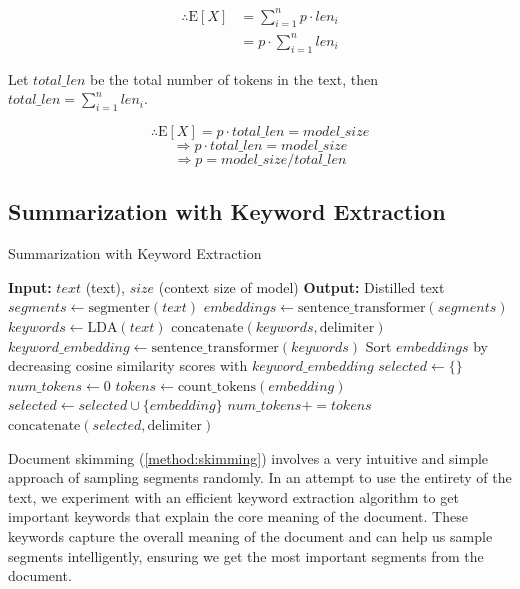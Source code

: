 			\begin{align*}
				\therefore \mathrm{E}[X] &= \sum_{i = 1}^{n} p \cdot len_i \\
				&= p \cdot \sum_{i = 1}^{n} len_i
			\end{align*}

			Let $total\_len$ be the total number of tokens in the text, then
			$total\_len = \sum_{i = 1}^{n} len_i$.

			\[ \therefore \mathrm{E}[X] = p \cdot total\_len = model\_size \]
			\[ \Rightarrow p \cdot total\_len = model\_size \]
			\[ \Rightarrow p = model\_size / total\_len \]


	\subsection{Summarization with Keyword Extraction}
		\label{method:keyword}

		\begin{algorithm*}
			\caption{Summarization with Keyword Extraction}
			\begin{algorithmic}
				\State \textbf{Input:} $text$ (text), $size$ (context size of model)
				\State \textbf{Output:} Distilled text
				\State $segments \leftarrow \text{segmenter}(text)$
				\State $embeddings \leftarrow \text{sentence\_transformer}(segments)$
				\State $keywords \leftarrow \text{LDA}(text)$
				\State $\text{concatenate}(keywords, \text{delimiter})$
				\State $keyword\_embedding \leftarrow \text{sentence\_transformer}(keywords)$
				\State Sort $embeddings$ by decreasing cosine similarity scores with $keyword\_embedding$
				\State $selected \leftarrow \{\}$
				\State $num\_tokens \leftarrow 0$
					\State $tokens \leftarrow \text{count\_tokens}(embedding)$
						\State $selected \leftarrow selected \cup \{embedding\}$
						\State $num\_tokens += tokens$
					\EndIf
				\EndFor
				\State $\text{concatenate}(selected, \text{delimiter})$
				\State {}
			\end{algorithmic}
			\label{algo:keyword}
		\end{algorithm*}

		Document skimming (\autoref{method:skimming}) involves a very intuitive and simple approach of
		sampling segments randomly.
		In an attempt to use the entirety of the text, we experiment with an efficient keyword extraction
		algorithm to get important keywords that explain the core meaning of the document.
		These keywords capture the overall meaning of the document and can help us sample segments
		intelligently, ensuring we get the most important segments from the document.

